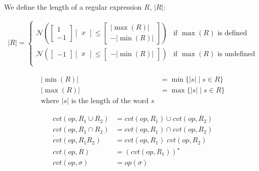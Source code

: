 We define the length of a regular expression $R$, $|R|$:

\begin{align}
    |R| = \begin{cases}
        \mathcal{N} \left(
            \begin{bmatrix}
                1 \\
                -1
            \end{bmatrix}
            \begin{bmatrix}
               x
            \end{bmatrix}
            \leq
            \begin{bmatrix}
                |\max(R)| \\
                -|\min(R)|
            \end{bmatrix}
        \right) & \text{if $\max(R)$ is defined} \\
        \mathcal{N} \left(
            \begin{bmatrix}
                -1
            \end{bmatrix}
            \begin{bmatrix}
               x
            \end{bmatrix}
            \leq
            \begin{bmatrix}
                -|\min(R)|
            \end{bmatrix}
        \right) & \text{if $\max(R)$ is undefined} \\
    \end{cases}
\end{align}

\begin{align}
    |\min(R)| &= \min\{ |s| \mid s \in R \} \\
    |\max(R)| &= \max\{ |s| \mid s \in R \} \\
    \text{where $|s|$ is the length of the word $s$}
\end{align}

\begin{align}
    cvt(op, R_1 \cup R_2) &= cvt(op, R_1) \cup cvt(op, R_2) \\
    cvt(op, R_1 \cap R_2) &= cvt(op, R_1) \cap cvt(op, R_2) \\
    cvt(op, R_1R_2) &= cvt(op, R_1) \; cvt(op, R_2) \\
    cvt(op, R) &= (cvt(op, R_1))^\star \\
    cvt(op, \sigma) &= op(\sigma)
\end{align}

